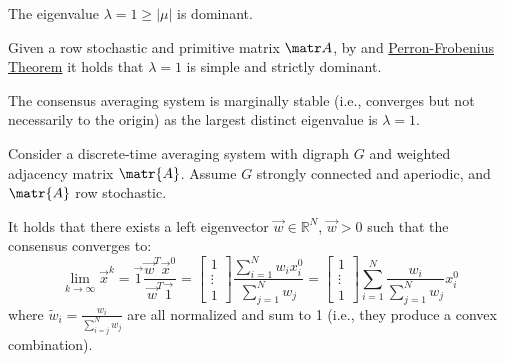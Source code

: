 \begin{subappendices}
\begin{lemma}
    \indenttbox
    \begin{corollary}
        The eigenvalue $\lambda=1 \geq |\mu|$ is dominant.
    \end{corollary}
\end{lemma}

\begin{lemma}
    Given a row stochastic and primitive matrix $\A$, by  and \hyperref[th:perron_frobenius]{Perron-Frobenius Theorem} it holds that $\lambda = 1$ is simple and strictly dominant.

    \indenttbox
    \begin{corollary}
        The consensus averaging system is marginally stable (i.e., converges but not necessarily to the origin) as the largest distinct eigenvalue is $\lambda = 1$.
    \end{corollary}
\end{lemma}





\begin{theorem} 
    Consider a discrete-time averaging system with digraph $G$ and weighted adjacency matrix $\matr{A}$. Assume $G$ strongly connected and aperiodic, and $\matr{A}$ row stochastic. 
    
    It holds that there exists a left eigenvector $\vec{w} \in \mathbb{R}^N$, $\vec{w} > 0$ such that the consensus converges to:
        \[ 
            \lim_{k \rightarrow \infty} \vec{x}^k 
            = \vec{1}\frac{\vec{w}^T \vec{x}^0}{\vec{w}^T\vec{1}} 
            = \begin{bmatrix} 1 \\ \vdots \\ 1 \end{bmatrix} \frac{\sum_{i=1}^N w_i x_i^0}{\sum_{j=1}^N w_j}
            = \begin{bmatrix} 1 \\ \vdots \\ 1 \end{bmatrix} \sum_{i=1}^N \frac{w_i}{\sum_{j=1}^N w_j} x_i^0
        \]
        where $\tilde{w}_i = \frac{w_i}{\sum_{i=j}^N w_j}$ are all normalized and sum to 1 (i.e., they produce a convex combination).


\end{theorem}
\end{subappendices}
